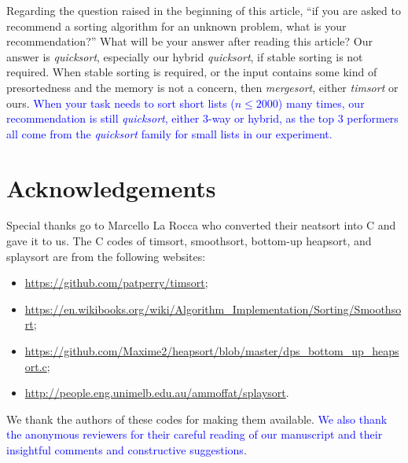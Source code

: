 \documentclass[AMA,STIX1COL]{WileyNJD-v2}
\newcommand{\qusort}{\emph{quicksort }}
\newcommand{\qusortn}{\emph{quicksort}}
\newcommand{\tsort}{\emph{timsort }}
\newcommand{\msortn}{\emph{mergesort}}
\begin{document}
Regarding the question raised in the beginning of this article, “if you are asked to recommend a sorting algorithm for an unknown problem, what is your recommendation?”  What will be your answer after reading this article?  Our answer is \qusortn, especially our hybrid \qusortn, if stable sorting is not required. 
When stable sorting is required, or the input contains some kind of presortedness and the memory is not a concern, then \msortn, either \tsort or ours. 
\textcolor{blue}{When your task needs to sort short lists ($n \le 2000$) many times, our recommendation is still \qusortn, either 3-way or hybrid, as the top 3 performers all come from the \qusort family for small lists in our experiment.}

\section{Acknowledgements} 
Special thanks go to Marcello La Rocca who converted their neatsort into C and gave it to us. 
The C codes of timsort, smoothsort, bottom-up heapsort, and splaysort are from the following websites: 
\begin{itemize}
\item \url{https://github.com/patperry/timsort};
\item \url{https://en.wikibooks.org/wiki/Algorithm_Implementation/Sorting/Smoothsort};
\item \url{https://github.com/Maxime2/heapsort/blob/master/dps\_bottom\_up\_heapsort.c};
\item \url{http://people.eng.unimelb.edu.au/ammoffat/splaysort}.
\end{itemize}
We thank the authors of these codes for making them available. 
\textcolor{blue}{We also thank the anonymous reviewers for their careful reading of our manuscript and their insightful comments and constructive suggestions}.



\appendix
\end{document}
